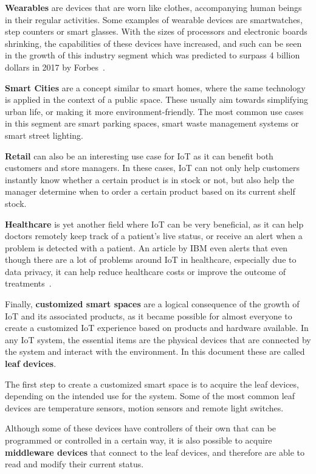 \documentclass[runningheads]{llncs}
\begin{document}
\textbf{Wearables} are devices that are worn like clothes, accompanying human beings in their regular activities. Some examples of wearable devices are smartwatches, step counters or smart glasses. With the sizes of processors and electronic boards shrinking, the capabilities of these devices have increased, and such can be seen in the growth of this industry segment which was predicted to surpass 4 billion dollars in 2017 by Forbes~\cite{Marr2016}.

\textbf{Smart Cities} are a concept similar to smart homes, where the same technology is applied in the context of a public space. These usually aim towards simplifying urban life, or making it more environment-friendly. The most common use cases in this segment are smart parking spaces, smart waste management systems or smart street lighting.

\textbf{Retail} can also be an interesting use case for IoT as it can benefit both customers and store managers. In these cases, IoT can not only help customers instantly know whether a certain product is in stock or not, but also help the manager determine when to order a certain product based on its current shelf stock.

\textbf{Healthcare} is yet another field where IoT can be very beneficial, as it can help doctors remotely keep track of a patient’s live status, or receive an alert when a problem is detected with a patient. An article by IBM even alerts that even though there are a lot of problems around IoT in healthcare, especially due to data privacy, it can help reduce healthcare costs or improve the outcome of treatments~\cite{Patel2017}.

Finally, \textbf{customized smart spaces} are a logical consequence of the growth of IoT and its associated products, as it became possible for almost everyone to create a customized IoT experience based on products and hardware available. In any IoT system, the essential items are the physical devices that are connected by the system and interact with the environment. In this document these are called \textbf{leaf devices}. 

The first step to create a customized smart space is to acquire the leaf devices, depending on the intended use for the system. Some of the most common leaf devices are temperature sensors, motion sensors and remote light switches.

Although some of these devices have controllers of their own that can be programmed or controlled in a certain way, it is also possible to acquire \textbf{middleware devices} that connect to the leaf devices, and therefore are able to read and modify their current status. 
\end{document}
